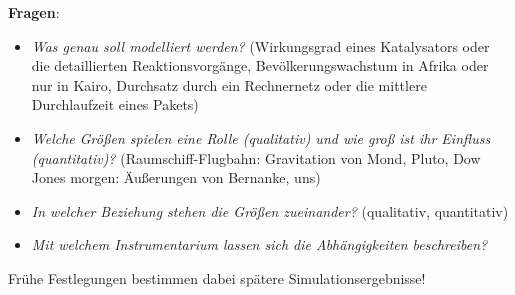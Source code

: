 \textbf{Fragen}:
\begin{itemize}
    \item
    \emph{Was genau soll modelliert werden?}
    (Wirkungsgrad eines Katalysators oder die detaillierten Reaktionsvorgänge,
    Bevölkerungswachstum in Afrika oder nur in Kairo,
    Durchsatz durch ein Rechnernetz oder die mittlere Durchlaufzeit eines Pakets)
    
    \item
    \emph{Welche Größen spielen eine Rolle (qualitativ)
    und wie groß ist ihr Einfluss (quantitativ)?}
    (Raumschiff-Flugbahn: Gravitation von Mond, Pluto,
    Dow Jones morgen: Äußerungen von Bernanke, uns)
    
    \item
    \emph{In welcher Beziehung stehen die Größen zueinander?}
    (qualitativ, quantitativ)
    
    \item
    \emph{Mit welchem Instrumentarium lassen sich die Abhängigkeiten beschreiben?}
\end{itemize}
Frühe Festlegungen bestimmen dabei spätere Simulationsergebnisse!

\linie

